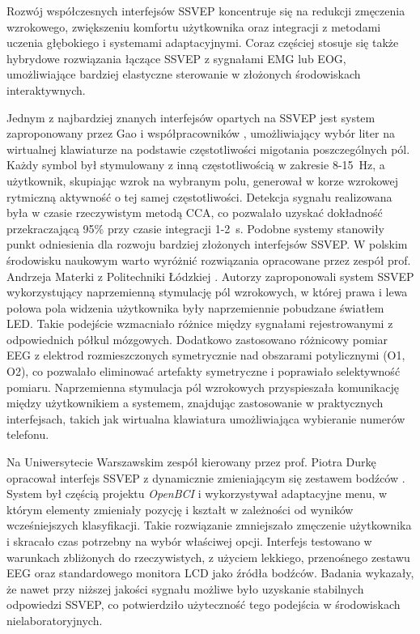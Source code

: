 Rozwój współczesnych interfejsów SSVEP koncentruje się na redukcji zmęczenia wzrokowego, zwiększeniu komfortu użytkownika oraz integracji z metodami uczenia głębokiego i systemami adaptacyjnymi. Coraz częściej stosuje się także hybrydowe rozwiązania łączące SSVEP z sygnałami EMG lub EOG, umożliwiające bardziej elastyczne sterowanie w złożonych środowiskach interaktywnych.

Jednym z najbardziej znanych interfejsów opartych na SSVEP jest system zaproponowany przez Gao i współpracowników \cite{gao2014}, umożliwiający wybór liter na wirtualnej klawiaturze na podstawie częstotliwości migotania poszczególnych pól. Każdy symbol był stymulowany z inną częstotliwością w zakresie 8-15~Hz, a użytkownik, skupiając wzrok na wybranym polu, generował w korze wzrokowej rytmiczną aktywność o tej samej częstotliwości. Detekcja sygnału realizowana była w czasie rzeczywistym metodą CCA, co pozwalało uzyskać dokładność przekraczającą 95\% przy czasie integracji 1-2~s. Podobne systemy stanowiły punkt odniesienia dla rozwoju bardziej złożonych interfejsów SSVEP. W polskim środowisku naukowym warto wyróżnić rozwiązania opracowane przez zespół prof. Andrzeja Materki z Politechniki Łódzkiej \cite{materka2006alternate, materka2007virtual}. Autorzy zaproponowali system SSVEP wykorzystujący naprzemienną stymulację pól wzrokowych, w której prawa i lewa połowa pola widzenia użytkownika były naprzemiennie pobudzane światłem LED. Takie podejście wzmacniało różnice między sygnałami rejestrowanymi z odpowiednich półkul mózgowych. Dodatkowo zastosowano różnicowy pomiar EEG z elektrod rozmieszczonych symetrycznie nad obszarami potylicznymi (O1, O2), co pozwalało eliminować artefakty symetryczne i poprawiało selektywność pomiaru. Naprzemienna stymulacja pól wzrokowych przyspieszała komunikację między użytkownikiem a systemem, znajdując zastosowanie w praktycznych interfejsach, takich jak wirtualna klawiatura umożliwiająca wybieranie numerów telefonu.  

Na Uniwersytecie Warszawskim zespół kierowany przez prof. Piotra Durkę opracował interfejs SSVEP z dynamicznie zmieniającym się zestawem bodźców \cite{durka2009open}. System był częścią projektu \textit{OpenBCI} i wykorzystywał adaptacyjne menu, w którym elementy zmieniały pozycję i kształt w zależności od wyników wcześniejszych klasyfikacji. Takie rozwiązanie zmniejszało zmęczenie użytkownika i skracało czas potrzebny na wybór właściwej opcji. Interfejs testowano w warunkach zbliżonych do rzeczywistych, z użyciem lekkiego, przenośnego zestawu EEG oraz standardowego monitora LCD jako źródła bodźców. Badania wykazały, że nawet przy niższej jakości sygnału możliwe było uzyskanie stabilnych odpowiedzi SSVEP, co potwierdziło użyteczność tego podejścia w środowiskach nielaboratoryjnych.

